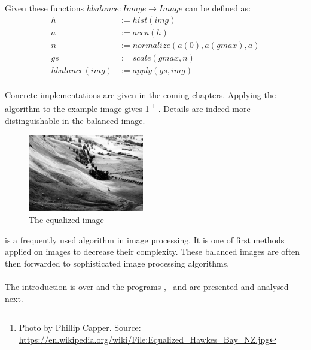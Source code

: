    Given these functions $hbalance: Image \rightarrow Image$ can be defined as:
    \begin{equation*}
    \begin{split}
        h & := hist(img) \\
        a & := accu(h) \\
        n & := normalize(a(0), a(gmax), a) \\
        gs & := scale(gmax,n) \\
      hbalance(img) & := apply(gs,img) \\
    \end{split}
    \end{equation*}
    
    Concrete implementations are given in the coming chapters.
    Applying the algorithm to the example image gives \ref{fig:img-eq}
    \footnote{Photo by Phillip Capper. Source: \url{https://en.wikipedia.org/wiki/File:Equalized_Hawkes_Bay_NZ.jpg}}
    . Details are indeed more distinguishable in the balanced image.
    
    \begin{figure}[h]
      \centering
      \includegraphics[width=0.45\textwidth]{img-eq}
      \caption{The equalized image}
      \label{fig:img-eq}
    \end{figure}
    
  \algo{} is a frequently used algorithm in image processing. It is 
  one of first methods applied on images to decrease their complexity.
  These balanced images are often then forwarded to sophisticated
  image processing algorithms.
  
  
  \paragraph{}
    The introduction is over and
    the programs \seq, \man\, \ndpn and \ndpv
    are presented and analysed next.
  
    
